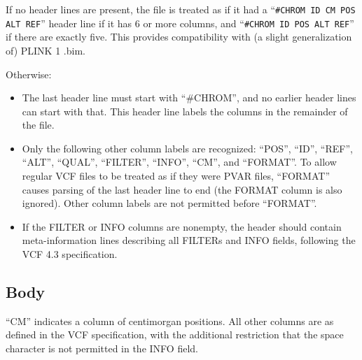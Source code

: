 \documentclass[8pt]{article}
\begin{document}
If no header lines are present, the file is treated as if it had a
``\texttt{\#CHROM ID CM POS ALT REF}'' header line if it has 6 or more columns,
and ``\texttt{\#CHROM ID POS ALT REF}'' if there are exactly five.  This
provides compatibility with (a slight generalization of) PLINK 1 .bim.

Otherwise:

\begin{itemize}
\item The last header line must start with ``\#CHROM'', and no earlier header
  lines can start with that.  This header line labels the columns in the
  remainder of the file.
\item Only the following other column labels are recognized: ``POS'', ``ID'',
  ``REF'', ``ALT'', ``QUAL'', ``FILTER'', ``INFO'', ``CM'', and ``FORMAT''.  To
  allow regular VCF files to be treated as if they were PVAR files, ``FORMAT''
  causes parsing of the last header line to end (the FORMAT column is also
  ignored).  Other column labels are not permitted before ``FORMAT''.
\item If the FILTER or INFO columns are nonempty, the header should contain
  meta-information lines describing all FILTERs and INFO fields, following the
  VCF 4.3 specification.
\end{itemize}

\subsection{Body}

``CM'' indicates a column of centimorgan positions.  All other columns are as
defined in the VCF specification, with the additional restriction that the
space character is not permitted in the INFO field.
\end{document}
